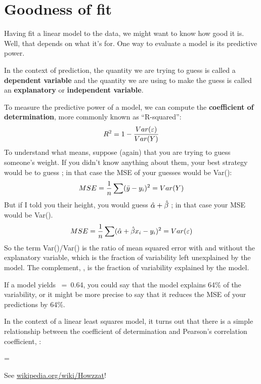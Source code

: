 \documentclass[12pt]{book}
\begin{document}
\section{Goodness of fit}

Having fit a linear model to the data, we might want to know how good
it is.  Well, that depends on what it's for.  One way to evaluate a
model is its predictive power.

In the context of prediction, the quantity we are trying to guess is
called a {\bf dependent variable} and the quantity we are using to
make the guess is called an {\bf explanatory} or {\bf independent
  variable}.

To measure the predictive power of a model, we can compute the {\bf
  coefficient of determination}, more commonly known as ``R-squared'':
%
\[ R^2 = 1 - \frac{Var(\varepsilon)}{Var(Y)}\]
%
To understand what \R{} means, suppose (again) that you are trying
to guess someone's weight.  If you didn't know anything about them,
your best strategy would be to guess \myybar; in
that case the MSE of your guesses would be Var(\Y):
%
\[ MSE = \frac{1}{n} \sum (\bar{y} - y_i)^2 = Var(Y) \]
%
But if I told you their height, you would guess $\hat{\alpha} +
\hat{\beta}$ \x{}; in that case your MSE would be Var(\myeps).
%
\[ MSE = 
\frac{1}{n} \sum (\hat{\alpha} + \hat{\beta} x_i - y_i)^2 =
Var(\varepsilon) \]
%
So the term Var(\myeps)/Var(\Y) is the ratio of mean squared error with
and without the explanatory variable, which is the fraction of
variability left unexplained by the model.  The complement, \R{},
is the fraction of variability explained by the model.

If a model yields \R{}~=~0.64, you could say that the model explains
64\% of the variability, or it might be more precise to say that it
reduces the MSE of your predictions by 64\%.

In the context of a linear least squares model, it turns out that
there is a simple relationship between the coefficient of
determination and Pearson's correlation coefficient, \myrho:

\quad \R{} = \myrho{}

See \url{wikipedia.org/wiki/Howzzat}!
\end{document}
